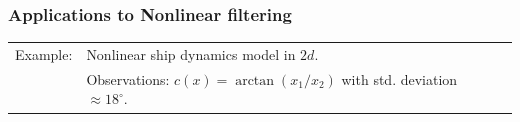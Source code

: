 \documentclass[xcolor=dvipsnames, subsection=false]{beamer}
\def\alertb#1{\alert{\color{BrickRed}  #1}}
\def\alertb#1{\alert{\color{BrickRed}  #1}}
\begin{document}
\begin{frame}
\frametitle{Applications to Nonlinear filtering}

\begin{minipage}[t][6.5cm][t]{\textwidth}
	
	\begin{tabular}{lll}\alertb{Example:}   & Nonlinear ship dynamics model in $2d$.
		\\
		&   Observations: $c(x) = \arctan(x_1/x_2)$ with std. deviation  $ \approx 18^\circ$.
	\end{tabular}
	
	
	\centering

\end{minipage}
\end{frame}
\end{document}
